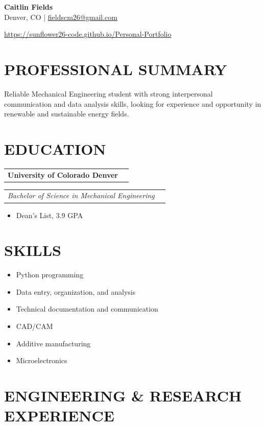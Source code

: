 \documentclass[10pt]{article}
\makeatletter
\newcommand{\companyLine}[2]{
\noindent
\begin{tabular*}{\textwidth}{@{\extracolsep{\fill}} l r}
\textbf{#1} & #2 \\
\end{tabular*}
}
\newcommand{\roleLine}[2]{
\noindent
\begin{tabular*}{\textwidth}{@{\extracolsep{\fill}} l r}
\textit{#1} & #2 \\
\end{tabular*}
}
\makeatother
\begin{document}
\begin{center}
{\Large \textbf{Caitlin Fields}} \\[2pt]
Denver, CO
 \quad | \quad
\href{mailto:fieldscm26@gmail.com}{fieldscm26@gmail.com}


\href{https://sunflower26-code.github.io/Personal-Portfolio}{https://sunflower26-code.github.io/Personal-Portfolio}


\end{center}

\section*{PROFESSIONAL SUMMARY}
Reliable Mechanical Engineering student with strong interpersonal communication and data analysis skills, looking for experience and opportunity in renewable and sustainable energy fields.

\section*{EDUCATION}
\companyLine{University of Colorado Denver}{}
\roleLine{Bachelor of Science in Mechanical Engineering}{}
\begin{itemize}
\item Dean's List, 3.9 GPA
\end{itemize}

\section*{SKILLS}
\begin{itemize}
\item Python programming
\item Data entry, organization, and analysis
\item Technical documentation and communication
\item CAD/CAM
\item Additive manufacturing
\item Microelectronics
\end{itemize}

\section*{ENGINEERING \& RESEARCH EXPERIENCE}
\end{document}
